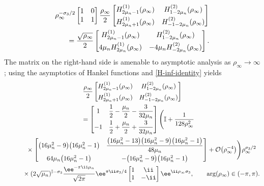 \begin{gather}
 \rho_\infty^{-\sigma_3/2} \begin{bmatrix} 1 & 0 \\ 1 & 1\end{bmatrix} \dfrac{\rho_\infty}{2} \begin{bmatrix}H_{2\mu_n - 1}^{(1)}(\rho_\infty) & H_{1 -2\mu_n}^{(2)}(\rho_\infty) \vspace{1mm}\\ H^{(1)}_{2\mu_n + 1}(\rho_\infty) & H_{-1 -2\mu_n}^{(2)}(\rho_\infty) \end{bmatrix}\nonumber\\
 \qquad= \dfrac{\sqrt{\rho_\infty}}{2} \begin{bmatrix} H_{2\mu_n-1}^{(1)}(\rho_\infty) & H_{1-2\mu_n}^{(2)}(\rho_\infty)\vspace{1mm}\\4\mu_n H_{2\mu_n}^{(1)}(\rho_\infty) & -4\mu_n H_{-2\mu_n}^{(2)}(\rho_\infty)\end{bmatrix}.\label{H-inf-identity}
\end{gather}
The matrix on the right-hand side is amenable to asymptotic analysis as $\rho_\infty \to \infty$; using the asymptotics of Hankel functions \cite[equations~(10.17.5) and (10.17.6)]{DLMF} and \eqref{H-inf-identity} yields
\begin{gather}
 \dfrac{\rho_\infty}{2} \begin{bmatrix}H_{2\mu_n - 1}^{(1)}(\rho_\infty) & H_{1 -2\mu_n}^{(2)}(\rho_\infty) \vspace{1mm}\\ H^{(1)}_{2\mu_n + 1}(\rho_\infty) & H_{-1 -2\mu_n}^{(2)}(\rho_\infty) \end{bmatrix}\nonumber\\
 \qquad= \begin{bmatrix} 1 & \dfrac{1}{2}-\dfrac{\mu_n}{2}-\dfrac{3}{32 \mu_n} \vspace{1mm}\\ -1 & \dfrac{1}{2} + \dfrac{\mu_n}{2}+\dfrac{3}{32 \mu_n}
\end{bmatrix} \Biggl( \mathbb{I}+ \dfrac{1}{128 \rho_\infty^2}  \nonumber\\
 \phantom{\qquad=}{}\times \begin{bmatrix} \big(16\mu_n^2 - 9\big)\big(16\mu_n^2 - 1\big) & \dfrac{\big(16 \mu_n^2 - 13\big)\big(16\mu_n^2 - 9\big)\big(16\mu_n^2 - 1\big)}{48\mu_n} \vspace{1mm}\\ 64\mu_n\big(16\mu_n^2 - 1\big) & - \big(16\mu_n^2 - 9\big)\big(16\mu_n^2 - 1\big)\end{bmatrix} + \mathcal{O}\big(\rho_\infty^{-4}\big)\Biggr) \rho_\infty^{\sigma_3/2} \nonumber\\
\phantom{\qquad=}{}\times (2\sqrt{\mu_n})^{\mathbb{I}-\sigma_3}{\dfrac{\ee^{-\pi \ii \mu_n}}{\sqrt{2\pi}}} {}{} \ee^{\pi \ii\sigma_3/4}\begin{bmatrix} 1 & \ii\\ 1 &-\ii \end{bmatrix} \ee^{\ii \rho_\infty \sigma_3}, \qquad \arg(\rho_\infty) \in (-\pi, \pi).\label{h-infty-asymptotics}
\end{gather}
